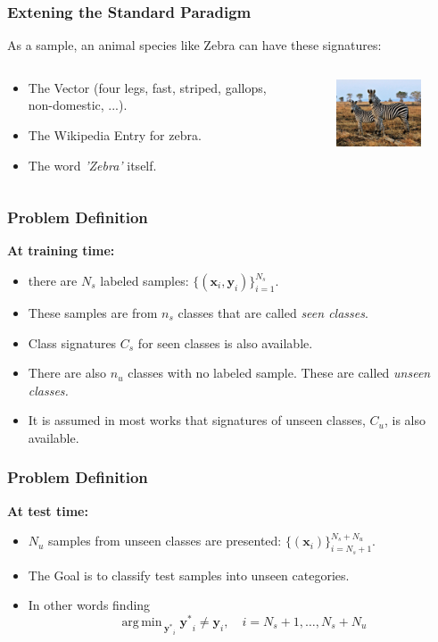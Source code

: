 \documentclass{beamer}
\DeclareMathOperator*{\argmin}{arg\,min\,}
\begin{document}
\begin{frame}\frametitle{Extening the Standard Paradigm}
    As a sample, an animal species like Zebra can have these signatures:
    \begin{columns}
    \begin{column}{7cm}
      \begin{itemize}
        \item The Vector (four legs, fast, striped, gallops, non-domestic, ...).
        \item The Wikipedia Entry for zebra.
        \item The word \textit{'Zebra'} itself.
      \end{itemize}
    \end{column}
    \begin{column}{5cm}
      \begin{figure}
      \includegraphics[width= 4cm]{zebra.jpg}
      \end{figure}
    \end{column}
\end{columns}
\end{frame}

\begin{frame}\frametitle{Problem Definition}
  \textbf{At training time:}
\begin{itemize}
  \item there are $N_s$ labeled samples:  $ \{ (\mathbf{x}_i, \mathbf{y}_i) \}_{i=1}^{N_s} $.
  \item These samples are from $n_s$ classes that are called \textit{seen classes}.
  \item Class signatures $C_s$ for seen classes is also available.
  \item There are also $n_u$ classes with no labeled sample. These are called \textit{unseen classes.}
  \item It is assumed in most works that signatures of unseen classes, $C_u$, is also available.
\end{itemize}
\end{frame}

\begin{frame}\frametitle{Problem Definition}
  \textbf{At test time:}
  \begin{itemize}
    \item  $N_u$ samples from unseen classes are presented: $ \{ (\mathbf{x}_i) \}_{i=N_s + 1}^{N_s + N_u} $.
    \item The Goal is to classify test samples into unseen categories.
    \item In other words finding
     $$ \argmin_{\mathbf{y^{\ast}}_i}  \mathbf{y^{\ast}}_i  \neq \mathbf{y}_i, \quad i= N_s +1 , \ldots, N_s + N_u $$
  \end{itemize}
\end{frame}
\end{document}
